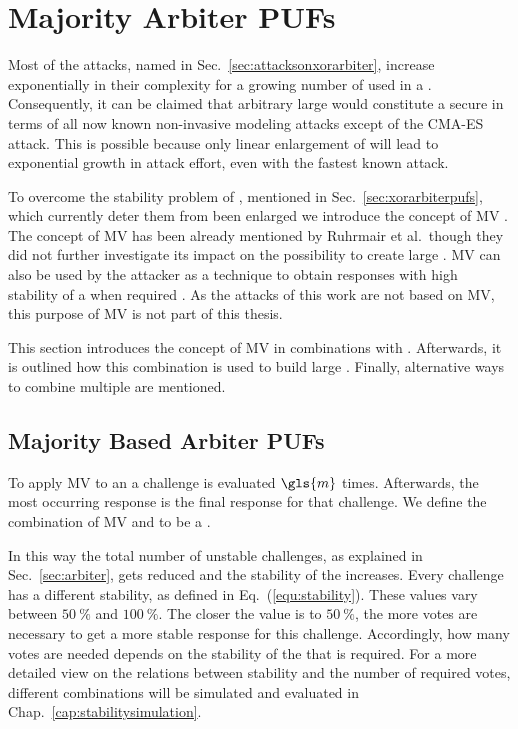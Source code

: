 \chapter{Majority Arbiter PUFs}
\label{cap:majorityarbiter}

Most of the attacks, named in Sec.\ \ref{sec:attacksonxorarbiter}, increase exponentially in their complexity for a growing number of used \apufs in a \xpuf.  %
Consequently, it can be claimed that arbitrary large \xpufs would constitute a secure \puf in terms of all now known non-invasive modeling attacks except of the \ac{CMA-ES} attack.
This is possible because only linear enlargement of \xpufs will lead to exponential growth in attack effort, even with the fastest known attack.

To overcome the stability problem of \xpufs, mentioned in Sec.\ \ref{sec:xorarbiterpufs}, which currently deter them from been enlarged we introduce the concept of \ac{MV} \cite{Majzoobi2010FPGALines}. %
The concept of \ac{MV} has been already mentioned by Ruhrmair et al.\, though they did not further investigate its impact on the possibility to create large \xpufs \cite{Ruhrmair2013PUFData}. %
\ac{MV} can also be used by the attacker as a technique to obtain responses with high stability of a \puf when required \cite{Ganji2016PACPUFs, Ozturk2008TowardsDevices}.
As the attacks of this work are not based on \ac{MV}, this purpose of \ac{MV} is not part of this thesis.

This section introduces the concept of \ac{MV} in combinations with \apufs.
Afterwards, it is outlined how this combination is used to build large \xpufs.
Finally, alternative ways to combine multiple \apufs are mentioned.


\section{Majority Based Arbiter PUFs}
\label{sec:majorityarbiter}

To apply \ac{MV} to an \apuf a challenge is evaluated $\gls{m}$ times.
Afterwards, the most occurring response is the final response for that challenge.
We define the combination of \ac{MV} and \apuf to be a \mpuf.

In this way the total number of unstable challenges, as explained in Sec.\ \ref{sec:arbiter}, gets reduced and the stability of the \apuf increases. %
Every challenge has a different stability, as defined in Eq.\ (\ref{equ:stability}). %
These values vary between $50\ \%$ and $100\ \%$.
The closer the value is to $50\ \%$, the more votes are necessary to get a more stable response for this challenge. %
Accordingly, how many votes are needed depends on the stability of the \apuf that is required. 
For a more detailed view on the relations between stability and the number of required votes, different combinations will be simulated and evaluated in Chap.\ \ref{cap:stabilitysimulation}.

